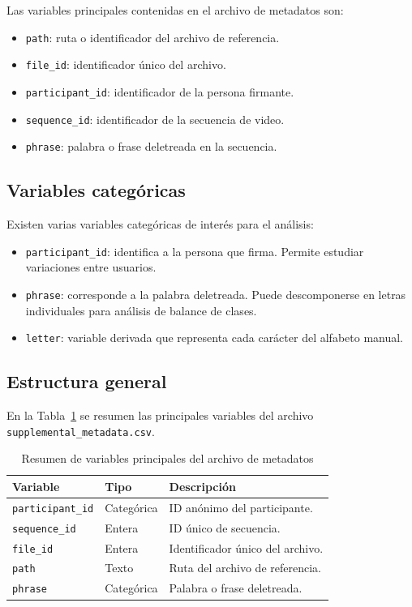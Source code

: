 \documentclass[12pt]{article}
\begin{document}
Las variables principales contenidas en el archivo de metadatos son:
\begin{itemize}
    \item \texttt{path}: ruta o identificador del archivo de referencia.
    \item \texttt{file\_id}: identificador único del archivo.
    \item \texttt{participant\_id}: identificador de la persona firmante.
    \item \texttt{sequence\_id}: identificador de la secuencia de video.
    \item \texttt{phrase}: palabra o frase deletreada en la secuencia.
\end{itemize}

\subsection{Variables categóricas}
Existen varias variables categóricas de interés para el análisis:
\begin{itemize}
    \item \texttt{participant\_id}: identifica a la persona que firma. Permite estudiar variaciones entre usuarios.
    \item \texttt{phrase}: corresponde a la palabra deletreada. Puede descomponerse en letras individuales para análisis de balance de clases.
    \item \texttt{letter}: variable derivada que representa cada carácter del alfabeto manual.
\end{itemize}

\subsection{Estructura general}
En la Tabla~\ref{tab:variables} se resumen las principales variables del archivo \texttt{supplemental\_metadata.csv}.

\begin{table}[h]
\centering
\caption{Resumen de variables principales del archivo de metadatos}
\label{tab:variables}
\begin{tabular}{@{}lll@{}}
\toprule
\textbf{Variable} & \textbf{Tipo} & \textbf{Descripción} \\ \midrule
\texttt{participant\_id} & Categórica & ID anónimo del participante. \\
\texttt{sequence\_id} & Entera & ID único de secuencia. \\
\texttt{file\_id} & Entera & Identificador único del archivo. \\
\texttt{path} & Texto & Ruta del archivo de referencia. \\
\texttt{phrase} & Categórica & Palabra o frase deletreada. \\
\bottomrule
\end{tabular}
\end{table}
\end{document}
